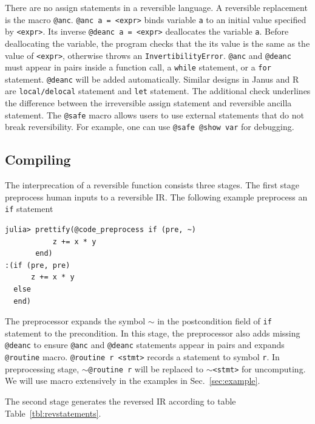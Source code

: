 \documentclass[aps,twocolumn,longbibliography,english,superscriptaddress]{revtex4-1}
\newcommand{\<}{\langle}
\renewcommand{\>}{\rangle}
\newcommand{\Tbl}[1]{Table~\ref{#1}}
\newcommand{\Sec}[1]{Sec.~\ref{#1}}
\theoremstyle{definition}\newtheorem{definition}{\textit{Definition}}
\begin{document}
    There are no assign statements in a reversible language. A reversible replacement is the macro \texttt{@anc}. \texttt{@anc a = <expr>} binds variable \texttt{a} to an initial value specified by \texttt{<expr>}. Its inverse \texttt{@deanc a = <expr>} deallocates the variable \texttt{a}. Before deallocating the variable, the program checks that the its value is the same as the value of \texttt{<expr>}, otherwise throws an \texttt{InvertibilityError}. \texttt{@anc} and \texttt{@deanc} must appear in pairs inside a function call, a \texttt{while} statement, or a \texttt{for} statement.
    \texttt{@deanc} will be added automatically. Similar designs in Janus and R are \texttt{local/delocal} statement and \texttt{let} statement.
    The additional check underlines the difference between the irreversible assign statement and reversible ancilla statement.
The \texttt{@safe} macro allows users to use external statements that do not break reversibility.
For example, one can use \texttt{@safe @show var} for debugging.

\subsection{Compiling}
The interprecation of a reversible function consists three stages.
The first stage preprocess human inputs to a reversible IR.
The following example preprocess an \texttt{if} statement

\begin{minipage}{.44\textwidth}
\begin{lstlisting}
julia> prettify(@code_preprocess if (pre, ~)
           z += x * y
       end)
:(if (pre, pre)
      z += x * y
  else
  end)
\end{lstlisting}
\end{minipage}

The preprocessor expands the symbol \texttt{$\sim$} in the postcondition field of \texttt{if} statement to the precondition. In this stage, the preprocessor also adds missing \texttt{@deanc} to ensure \texttt{@anc} and \texttt{@deanc} statements appear in pairs and  expands \texttt{@routine} macro.
\texttt{@routine r <stmt>} records a statement to symbol \texttt{r}. In preprocessing stage, \texttt{$\sim$@routine r} will be replaced to \texttt{$\sim$<stmt>} for uncomputing. We will use macro extensively in the examples in \Sec{sec:example}.

The second stage generates the reversed IR according to table \Tbl{tbl:revstatements}.
\end{document}
